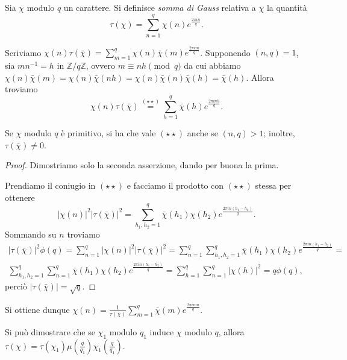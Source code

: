 \begin{defn}
  Sia $\chi$ modulo $q$ un carattere. Si definisce \textit{somma di Gauss} relativa a $\chi$ la quantità
  $$\tau(\chi)=\sum_{n=1}^q\chi(n)e^{\frac{2\pi in}{q}}.$$
\end{defn}

\begin{oss}
  Scriviamo $\displaystyle \chi(n)\tau(\bar{\chi})=\sum_{m=1}^q \chi(n)\bar{\chi}(m)e^{\frac{2\pi im}{q}}$.
  Supponendo $(n,q)=1$, sia $mn^{-1}=h$ in $\mathbb{Z}/q \mathbb{Z}$, ovvero $m \equiv nh \pmod{q}$ da cui abbiamo $\chi(n)\bar{\chi}(m)=\chi(n)\bar{\chi}(nh)=\chi(n)\bar{\chi}(n)\bar{\chi}(h)=\bar{\chi}(h)$. Allora troviamo
  $$\chi(n)\tau(\bar{\chi})\overset{(\star\star)}{=}\sum_{h=1}^q \bar{\chi}(h)e^{\frac{2\pi inh}{q}}.$$
\end{oss}

\begin{prop}
  Se $\chi$ modulo $q$ è primitivo, si ha che vale $(\star\star)$ anche se $(n,q)>1$; inoltre, $\tau(\bar{\chi})\not=0$.
\end{prop}

\begin{proof}
  Dimostriamo solo la seconda asserzione, dando per buona la prima.

  Prendiamo il coniugio in $(\star\star)$ e facciamo il prodotto con $(\star\star)$ stessa per ottenere
  $$|\chi(n)|^2|\tau(\bar{\chi})|^2=\sum_{h_1,h_2=1}^q \bar{\chi}(h_1)\chi(h_2)e^{\frac{2\pi in(h_1-h_2)}{q}}.$$
  Sommando su $n$ troviamo
  \begin{gather*}
    |\tau(\bar{\chi})|^2\phi(q)=\sum_{n=1}^q |\chi(n)|^2|\tau(\bar{\chi})|^2=\sum_{n=1}^q \sum_{h_1,h_2=1}^q \bar{\chi}(h_1)\chi(h_2)e^{\frac{2\pi in(h_1-h_2)}{q}}= \\
    \sum_{h_1,h_2=1}^q \sum_{n=1}^q \bar{\chi}(h_1)\chi(h_2)e^{\frac{2\pi in(h_1-h_2)}{q}}=\sum_{h=1}^q \sum_{n=1}^q |\chi(h)|^2=q\phi(q),
  \end{gather*}
  perciò $|\tau(\bar{\chi})|=\sqrt{q}$.
\end{proof}

Si ottiene dunque $\displaystyle \chi(n)=\frac{1}{\tau(\bar{\chi})}\sum_{m=1}^q \bar{\chi}(m)e^{\frac{2\pi imn}{q}}$.

\begin{oss}
  Si può dimostrare che se $\chi_1$ modulo $q_1$ induce $\chi$ modulo $q$, allora $\tau(\chi)=\tau(\chi_1)\mu\left(\frac{q}{q_1}\right)\chi_1\left(\frac{q}{q_1}\right)$.
\end{oss}
